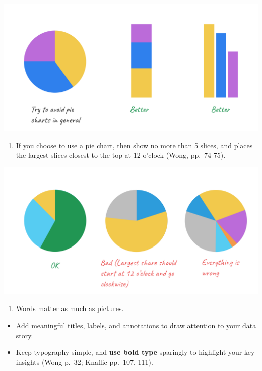 \documentclass[
  english,
]{book}
\providecommand{\tightlist}{%
  \setlength{\itemsep}{0pt}\setlength{\parskip}{0pt}}
\begin{document}
\includegraphics{images/05-chart/Chart - 11 - No pie chart.png}

\begin{enumerate}
\def\labelenumi{\arabic{enumi})}
\setcounter{enumi}{11}
\tightlist
\item
  If you choose to use a pie chart, then show no more than 5 slices, and places the largest slices closest to the top at 12 o'clock (Wong, pp.~74-75).
\end{enumerate}

\includegraphics{images/05-chart/Chart - 12 - Pie chart rules.png}

\begin{enumerate}
\def\labelenumi{\arabic{enumi})}
\setcounter{enumi}{12}
\tightlist
\item
  Words matter as much as pictures.
\end{enumerate}

\begin{itemize}
\tightlist
\item
  Add meaningful titles, labels, and annotations to draw attention to your data story.
\item
  Keep typography simple, and \textbf{use bold type} sparingly to highlight your key insights (Wong p.~32; Knaflic pp.~107, 111).
\end{itemize}
\end{document}
